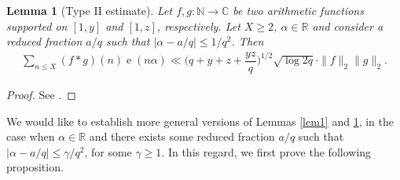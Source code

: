 \documentclass[11pt]{amsart}
\numberwithin{equation}{section}
\numberwithin{figure}{section}
\newtheorem{lemma}{Lemma}[section]
\theoremstyle{definition}
\newcommand{\e}{\operatorname{e}}
\begin{document}
\begin{lemma}[Type II estimate]\label{lem2}
Let $f, g\colon \mathbb{N}\to \mathbb{C}$ be two arithmetic functions supported on $[1, y]$ and $[1, z]$, respectively. Let $X\geqslant 2$, $\alpha\in \mathbb{R}$ and consider a reduced fraction $a/q$ such that $|\alpha-a/q|\leqslant 1/q^2$. Then
\begin{align*}
\sum_{n\leqslant X}(f*g)(n)\e(n\alpha)\ll \bigg(q + y +z + \dfrac{yz}{q}\bigg)^{1/2}\sqrt{\log 2q}\cdot \|f\|_2\|g\|_2.
\end{align*}
\end{lemma}
\begin{proof}
    See \cite[Theorem 23.6]{K2019}.
\end{proof}

We would like to establish more general versions of Lemmas \ref{lem1} and \ref{lem2}, in the case when $\alpha\in \mathbb{R}$ and there exists some reduced fraction $a/q$ such that $|\alpha-a/q|\leqslant\gamma/q^2$, for some $\gamma \geqslant 1$. In this regard, we first prove the following proposition.
\end{document}
